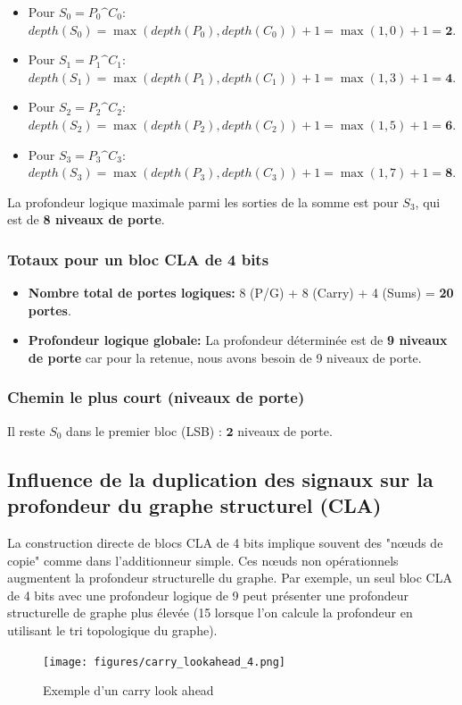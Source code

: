 \begin{itemize}
    \item Pour $S_0 = P_0 \text{\textasciicircum} C_0$:
        $depth(S_0) = \max(depth(P_0), depth(C_0)) + 1 = \max(1, 0) + 1 = \textbf{2}$.
    \item Pour $S_1 = P_1 \text{\textasciicircum} C_1$:
        $depth(S_1) = \max(depth(P_1), depth(C_1)) + 1 = \max(1, 3) + 1 = \textbf{4}$.
    \item Pour $S_2 = P_2 \text{\textasciicircum} C_2$:
        $depth(S_2) = \max(depth(P_2), depth(C_2)) + 1 = \max(1, 5) + 1 = \textbf{6}$.
    \item Pour $S_3 = P_3 \text{\textasciicircum} C_3$:
        $depth(S_3) = \max(depth(P_3), depth(C_3)) + 1 = \max(1, 7) + 1 = \textbf{8}$.
\end{itemize}
La profondeur logique maximale parmi les sorties de la somme est pour $S_3$, qui est de \textbf{8 niveaux de porte}.

\subsubsection{Totaux pour un bloc CLA de 4 bits}
\begin{itemize}
    \item \textbf{Nombre total de portes logiques:} 8 (P/G) + 8 (Carry) + 4 (Sums) = \textbf{20 portes}.
    \item \textbf{Profondeur logique globale:} La profondeur déterminée est de \textbf{9 niveaux de porte} car pour la retenue, nous avons besoin de 9 niveaux de porte.
\end{itemize}


\subsubsection{Chemin le plus court (niveaux de porte)}
Il reste $S_0$ dans le premier bloc (LSB) : $\boldsymbol{2}$ niveaux de porte.

\subsection{Influence de la duplication des signaux sur la profondeur du graphe structurel (CLA)}
La construction directe de blocs CLA de 4 bits implique souvent des "nœuds de copie" comme dans l'additionneur simple. Ces nœuds non opérationnels augmentent la profondeur structurelle du graphe. Par exemple, un seul bloc CLA de 4 bits avec une profondeur logique de 9 peut présenter une profondeur structurelle de graphe plus élevée (15 lorsque l'on calcule la profondeur en utilisant le tri topologique du graphe).

\begin{figure}[H]
    \centering
    \texttt{[image: figures/carry\_lookahead\_4.png]}
    \caption{Exemple d'un carry look ahead}
    \label{fig:}
\end{figure}
